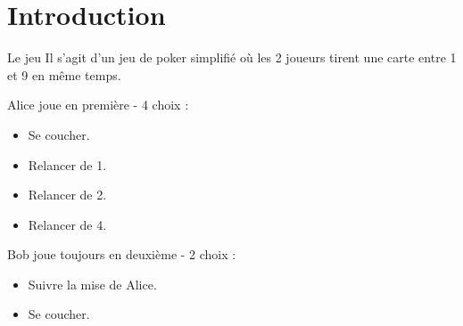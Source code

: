 \section{Introduction}
\begin{frame}{Le jeu}
Il s'agit d'un jeu de poker simplifié où les 2 joueurs tirent une carte entre 1 et 9 en même temps.
\begin{block}{Alice joue en première - 4 choix :}
\begin{itemize}
    \item Se coucher.
    \item Relancer de 1.
    \item Relancer de 2.
    \item Relancer de 4.
\end{itemize}
\end{block}
\begin{exampleblock}{Bob joue toujours en deuxième - 2 choix :}
 \begin{itemize}
        \item Suivre la mise de Alice.
        \item Se coucher.
    \end{itemize}
\end{exampleblock} 

\end{frame}

